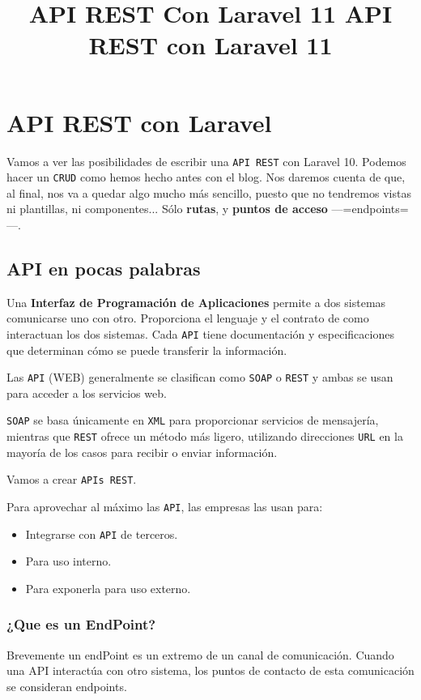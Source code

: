 \documentclass[11pt]{article}
\date{}
\title{API REST Con Laravel 11 API REST con Laravel 11}
\begin{document}
\maketitle
\setcounter{tocdepth}{3}
\tableofcontents

\setlength\parindent{10pt}

\section{API REST con Laravel}
\label{sec:org157bec4}
Vamos a ver las posibilidades de escribir una \texttt{API REST} con
Laravel 10. Podemos hacer un \texttt{CRUD} como hemos hecho antes con el
blog. Nos daremos cuenta de que, al final, nos va a quedar algo mucho
más sencillo, puesto que no tendremos vistas ni plantillas, ni
componentes... Sólo \textbf{rutas}, y \textbf{puntos de acceso} —=endpoints=—.

\subsection{API en pocas palabras}
\label{sec:org1651989}
Una \textbf{Interfaz de Programación de Aplicaciones} permite a dos sistemas
comunicarse uno con otro. Proporciona el lenguaje y el contrato de
como interactuan los dos sistemas. Cada \texttt{API} tiene documentación y
especificaciones que determinan cómo se puede transferir la
información.

Las \texttt{API} (WEB) generalmente se clasifican como \texttt{SOAP} o \texttt{REST} y
ambas se usan para acceder a los servicios web.

\texttt{SOAP} se basa únicamente en \texttt{XML} para proporcionar servicios de
mensajería, mientras que \texttt{REST} ofrece un método más ligero, utilizando
direcciones \texttt{URL} en la mayoría de los casos para recibir o enviar
información.

Vamos a crear \texttt{APIs REST}.

Para aprovechar al máximo las \texttt{API}, las empresas las usan para:
\begin{itemize}
\item Integrarse con \texttt{API} de terceros.
\item Para uso interno.
\item Para exponerla para uso externo.
\end{itemize}



\page


\subsubsection{¿Que es un EndPoint?}
\label{sec:org6ec9dba}
Brevemente un endPoint es un extremo de un canal de
comunicación. Cuando una API interactúa con otro sistema, los puntos
de contacto de esta comunicación se consideran endpoints.
\end{document}
